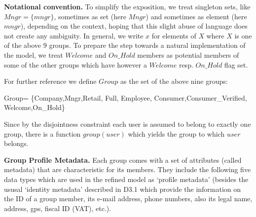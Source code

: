 \bigskip
{\bf Notational convention.} To simplify the exposition, we treat singleton sets, like $Mngr=\{mngr\}$, sometimes as set (here $Mngr$) and sometimes as element (here $mngr$), depending on the context, hoping that this slight abuse of language does not create any ambiguity. 
In general, we write $x$ for elements of $X$ where $X$ is one of the above 9 groups. To prepare the step towards a natural implementation of the model, we treat $Welcome$ and $On\_Hold$ members as potential members of some of the other groups which have however a $Welcome$ resp. $On\_Hold$ flag set. 

For further reference we define $Group$ as the set of the above nine groups:
\begin{asm}
Group= \+
       \{Company,Mngr,Retail, Full, Employee,\+
             Consumer,Consumer\_Verified, Welcome,On\_Hold\}
\end{asm}

Since by the disjointness constraint each user is assumed to belong to exactly one group, there is a function $group(user)$ which yields the group to which $user$ belongs.

\bigskip
{\bf Group Profile Metadata.} Each group comes with a set of attributes (called metadata) that are characteristic for its members. They include the following five data types which are used in the refined model as `profile metadata' (besides the ususal `identity metadata' described in D3.1 which provide the information on the ID of a group member, its e-mail address, phone numbers, also its legal name, address, gps, fiscal ID (VAT), etc.).


